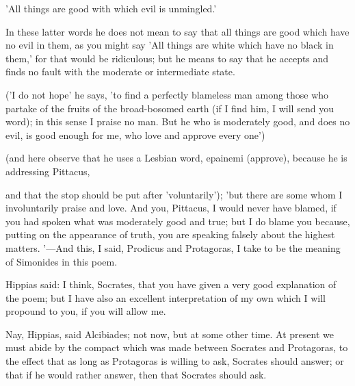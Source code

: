 \documentclass[11pt,letter]{article}
\begin{document}
\par  'All things are good with which evil is unmingled.'

\par  In these latter words he does not mean to say that all things are good which have no evil in them, as you might say 'All things are white which have no black in them,' for that would be ridiculous; but he means to say that he accepts and finds no fault with the moderate or intermediate state.

\par  ('I do not hope' he says, 'to find a perfectly blameless man among those who partake of the fruits of the broad-bosomed earth (if I find him, I will send you word); in this sense I praise no man. But he who is moderately good, and does no evil, is good enough for me, who love and approve every one')

\par  (and here observe that he uses a Lesbian word, epainemi (approve), because he is addressing Pittacus,
 
\par  and that the stop should be put after 'voluntarily'); 'but there are some whom I involuntarily praise and love. And you, Pittacus, I would never have blamed, if you had spoken what was moderately good and true; but I do blame you because, putting on the appearance of truth, you are speaking falsely about the highest matters. '—And this, I said, Prodicus and Protagoras, I take to be the meaning of Simonides in this poem.

\par  Hippias said: I think, Socrates, that you have given a very good explanation of the poem; but I have also an excellent interpretation of my own which I will propound to you, if you will allow me.

\par  Nay, Hippias, said Alcibiades; not now, but at some other time. At present we must abide by the compact which was made between Socrates and Protagoras, to the effect that as long as Protagoras is willing to ask, Socrates should answer; or that if he would rather answer, then that Socrates should ask.
\end{document}
